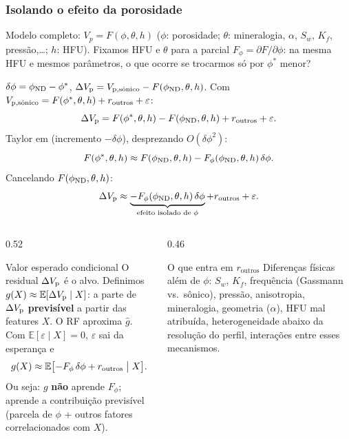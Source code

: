 \documentclass[aspectratio=169,10pt]{beamer}
\begin{document}
\begin{frame}[shrink=5]
  \frametitle{Isolando o efeito da porosidade}
  \scriptsize
  \setlength{\abovedisplayskip}{1.5pt}
  \setlength{\belowdisplayskip}{1.5pt}
  \setlength{\abovedisplayshortskip}{0.5pt}
  \setlength{\belowdisplayshortskip}{0.5pt}
  Modelo completo: $V_p=F(\phi,\theta,h)$
  ($\phi$: porosidade; $\theta$: mineralogia, $\alpha$, $S_w$, $K_f$,
  pressão,\ldots; $h$: HFU).
  Fixamos HFU e $\theta$ para a parcial
  $F_\phi=\partial F/\partial\phi$:
  na mesma HFU e mesmos parâmetros, o que ocorre se
  trocarmos só \phiND{} por $\phi^{*}$ menor?
  \vspace{0.03cm}

  $\delta\phi=\phiND{}-\phi^{*}$,
  $\dVp=\Vpsonsub-F(\phiND{},\theta,h)$.
  Com $\Vpsonsub=F(\phi^{*},\theta,h)+r_{\mathrm{outros}}+\varepsilon$:
  \[
    \dVp = F(\phi^{*},\theta,h)-F(\phiND{},\theta,h)
    +r_{\mathrm{outros}}+\varepsilon.
  \]
  Taylor em \phiND{} (incremento $-\delta\phi$),
  desprezando $O(\delta\phi^{2})$:
  \[
    F(\phi^{*},\theta,h)
    \approx F(\phiND{},\theta,h)
    -F_\phi(\phiND{},\theta,h)\,\delta\phi.
  \]
  Cancelando $F(\phiND{},\theta,h)$:
  \[
    \dVp
    \approx
    \underbrace{-F_\phi(\phiND{},\theta,h)\,\delta\phi}
      _{\text{efeito isolado de }\phi}
    + r_{\mathrm{outros}} + \varepsilon.
  \]
  \vspace{0.04cm}
  \begin{columns}[T,onlytextwidth]
    \begin{column}{0.52\textwidth}
      \begin{block}{Valor esperado condicional}
        \scriptsize
        O residual $\dVp$ é o alvo.
        Definimos
        $g(X)\approx\mathbb{E}[\dVp\mid X]$:
        a parte de $\dVp$ \textbf{previsível}
        a partir das features $X$.
        O RF aproxima $\widehat{g}$.
        Com $\mathbb{E}[\varepsilon\mid X]=0$,
        \(\varepsilon\) sai da esperança e
        \[
          g(X)\approx
          \mathbb{E}\bigl[
            -F_\phi\,\delta\phi
            +r_{\mathrm{outros}}
            \bigm| X\bigr].
        \]
        Ou seja: $g$ \textbf{não} aprende $F_\phi$;
        aprende a contribuição previsível
        (parcela de $\phi$ + outros fatores
        correlacionados com $X$).
      \end{block}
    \end{column}
    \begin{column}{0.46\textwidth}
      \begin{block}{O que entra em $r_{\mathrm{outros}}$}
        \scriptsize
        Diferenças físicas além de $\phi$:
        $S_w$, $K_f$, frequência (Gassmann
        vs.\ sônico), pressão, anisotropia,
        mineralogia, geometria ($\alpha$),
        HFU mal atribuída, heterogeneidade
        abaixo da resolução do perfil,
        interações entre esses mecanismos.
      \end{block}
    \end{column}
  \end{columns}
\end{frame}
\end{document}
